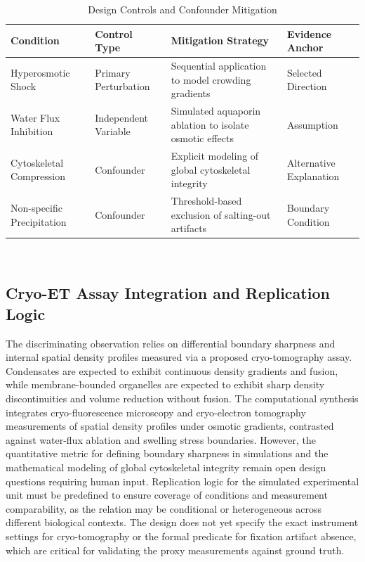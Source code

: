\documentclass[conference]{IEEEtran}
\begin{document}
\begin{table}[htbp]
\centering
\footnotesize
\setlength{\tabcolsep}{3pt}
\renewcommand{\arraystretch}{1.12}
\caption{Design Controls and Confounder Mitigation}
\label{tab:model-controls-and-repeats-control-matrix}
\begin{tabular}{|p{}|p{}|p{}|p{}|}
\hline
Condition & Control Type & Mitigation Strategy & Evidence Anchor \\\hline
Hyperosmotic Shock & Primary Perturbation & Sequential application to model crowding gradients & Selected Direction \\\hline
Water Flux Inhibition & Independent Variable & Simulated aquaporin ablation to isolate osmotic effects & Assumption \\\hline
Cytoskeletal Compression & Confounder & Explicit modeling of global cytoskeletal integrity & Alternative Explanation \\\hline
Non-specific Precipitation & Confounder & Threshold-based exclusion of salting-out artifacts & Boundary Condition \\\hline
\end{tabular}
\end{table}~\cite{cite_3222d2eeb7add195,cite_3480a6462f7a2d86}

\subsection{Cryo-ET Assay Integration and Replication Logic}
The discriminating observation relies on differential boundary sharpness and internal spatial density profiles measured via a proposed cryo-tomography assay. Condensates are expected to exhibit continuous density gradients and fusion, while membrane-bounded organelles are expected to exhibit sharp density discontinuities and volume reduction without fusion. The computational synthesis integrates cryo-fluorescence microscopy and cryo-electron tomography measurements of spatial density profiles under osmotic gradients, contrasted against water-flux ablation and swelling stress boundaries. However, the quantitative metric for defining boundary sharpness in simulations and the mathematical modeling of global cytoskeletal integrity remain open design questions requiring human input. Replication logic for the simulated experimental unit must be predefined to ensure coverage of conditions and measurement comparability, as the relation may be conditional or heterogeneous across different biological contexts. The design does not yet specify the exact instrument settings for cryo-tomography or the formal predicate for fixation artifact absence, which are critical for validating the proxy measurements against ground truth.~\cite{cite_9ae4c49700eea560,cite_e2b5e3dbdb69d6a2,cite_42ed299a53990c06}
\end{document}
